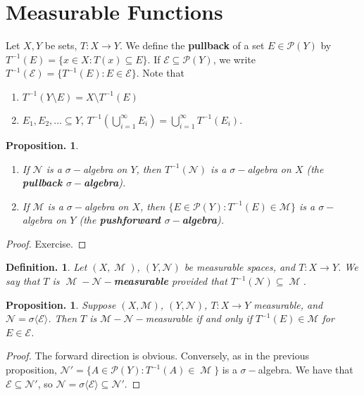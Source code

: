 \documentclass[11pt, a4paper]{memoir}
\newcommand{\mbf}[1]{{\boldmath\bfseries #1}}
\theoremstyle{change}
\newtheorem{proposition}[theorem]{Proposition.}
\theoremstyle{plain}
\theoremstyle{nonumberplain}
\newtheorem{definition}{Definition.}
\newtheorem{proof}{Proof}
\DeclareMathOperator{\M}{{\mathcal{M}}}
\numberwithin{equation}{section}
\begin{document}
\section{Measurable Functions}
Let $X,Y$ be sets, $T:X\to Y$.
We define the \textbf{pullback} of a set $E\in\mathcal{P}(Y)$ by $T^{-1}(E)=\{x\in X:T(x)\subseteq E\}$.
If $\mathcal{E}\subseteq\mathcal{P}(Y)$, we write $T^{-1}(\mathcal{E})=\{T^{-1}(E):E\in\mathcal{E}\}$.
Note that
\begin{enumerate}
    \item $T^{-1}(Y\setminus E)=X\setminus T^{-1}(E)$
    \item $E_1,E_2,\ldots\subseteq Y$, $T^{-1}\left(\bigcup_{i=1}^\infty E_i\right)=\bigcup_{i=1}^\infty T^{-1}(E_i)$.
\end{enumerate}
\begin{proposition}
    \begin{enumerate}[nl,r]
        \item If $\mathcal{N}$ is a $\sigma-$algebra on $Y$, then $T^{-1}(\mathcal{N})$ is a $\sigma-$algebra on $X$ (the \mbf{pullback $\sigma-$algebra}).
        \item If $\mathcal{M}$ is a $\sigma-$algebra on $X$, then $\bigl\{E\in\mathcal{P}(Y):T^{-1}(E)\in\mathcal{M}\bigr\}$ is a $\sigma-$algebra on $Y$ (the \mbf{pushforward $\sigma-$algebra}).
    \end{enumerate}
\end{proposition}
\begin{proof}
    Exercise.
\end{proof}
\begin{definition}
    Let $(X,\M)$, $(Y,\mathcal{N})$ be measurable spaces, and $T:X\to Y$.
    We say that $T$ is \mbf{$\M-\mathcal{N}-$measurable} provided that $T^{-1}(\mathcal{N})\subseteq\M$.
\end{definition}
\begin{proposition}
    Suppose $(X,\mathcal{M})$, $(Y,\mathcal{N})$, $T:X\to Y$ measurable, and $\mathcal{N}=\sigma\langle\mathcal{E}\rangle$.
    Then $T$ is $\mathcal{M}-\mathcal{N}-$measurable if and only if $T^{-1}(E)\in\mathcal{M}$ for $E\in\mathcal{E}$.
\end{proposition}
\begin{proof}
    The forward direction is obvious.
    Conversely, as in the previous proposition, $\mathcal{N}'=\{A\in\mathcal{P}(Y):T^{-1}(A)\in\M\}$ is a $\sigma-$algebra.
    We have that $\mathcal{E}\subseteq\mathcal{N}'$, so $\mathcal{N}=\sigma\langle\mathcal{E}\rangle\subseteq\mathcal{N}'$.
\end{proof}
\end{document}
